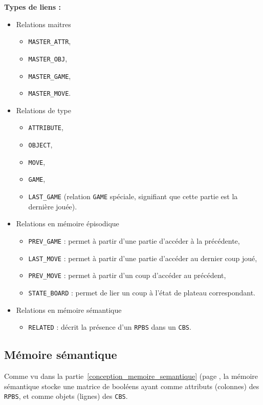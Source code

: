 \textbf{Types de liens :}
\begin{itemize}
	\item Relations maitres
		\begin{itemize}
			\item \texttt{MASTER\_ATTR},
			\item \texttt{MASTER\_OBJ},
			\item \texttt{MASTER\_GAME},
			\item \texttt{MASTER\_MOVE}.
		\end{itemize}
	\item Relations de type
		\begin{itemize}
			\item \texttt{ATTRIBUTE},
			\item \texttt{OBJECT},
			\item \texttt{MOVE},
			\item \texttt{GAME},
			\item \texttt{LAST\_GAME} (relation \texttt{GAME} spéciale, signifiant que cette partie est la dernière jouée).
		\end{itemize}
	\item Relations en mémoire épisodique
		\begin{itemize}
			\item \texttt{PREV\_GAME} : permet à partir d'une partie d'accéder à la précédente,
			\item \texttt{LAST\_MOVE} : permet à partir d'une partie d'accéder au dernier coup joué,
			\item \texttt{PREV\_MOVE} : permet à partir d'un coup d'accéder au précédent,
			\item \texttt{STATE\_BOARD} : permet de lier un coup à l'état de plateau correspondant.
		\end{itemize}
	\item Relations en mémoire sémantique
		\begin{itemize}
			\item \texttt{RELATED} : décrit la présence d'un \texttt{\gls{RPBS}} dans un \texttt{\gls{CBS}}.
		\end{itemize}
	\end{itemize}
	
\subsection{Mémoire sémantique}
Comme vu dans la partie~\ref{conception_memoire_semantique} (page \pageref{conception_memoire_semantique}, la mémoire sémantique stocke une matrice de booléens ayant comme attributs (colonnes) des \texttt{\gls{RPBS}}, et comme objets (lignes) des \texttt{\gls{CBS}}.

